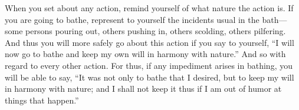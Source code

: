 When you set about any action, remind yourself of what nature the action
is. If you are going to bathe, represent to yourself the incidents usual
in the bath---some persons pouring out, others pushing in, others scolding,
others pilfering. And thus you will more safely go about this action if
you say to yourself, ``I will now go to bathe and keep my own will in
harmony with nature.'' And so with regard to every other action. For thus,
if any impediment arises in bathing, you will be able to say, ``It was not
only to bathe that I desired, but to keep my will in harmony with nature;
and I shall not keep it thus if I am out of humor at things that happen.''
